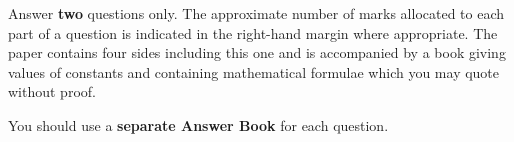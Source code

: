 \documentclass[txfonts]{NSTexam}
\begin{document}

\date{Tuesday 17 January 2017:      14:00 to 16:00}

\begin{rubric}
%
Answer {\textbf{two}} questions only.  The approximate number of marks allocated to each part of a question is indicated in the right-hand margin where appropriate. The paper contains four sides including this one and is accompanied by a book giving values of constants and containing mathematical formulae which you may quote without proof.

You should use a {\textbf{separate Answer Book}} for each question.
%
\end{rubric}


\warning

\newpage
\sectionfalse
\end{document}
